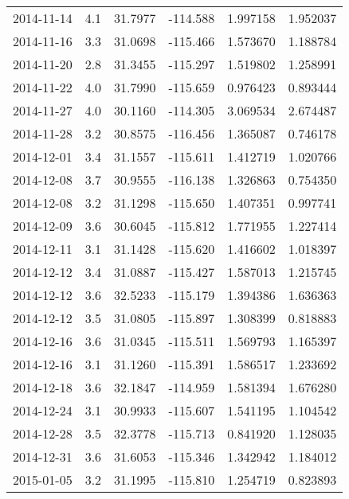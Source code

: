 \begin{tabular}{lrrrrr}
2014-11-14 &       4.1 &  31.7977 &  -114.588 &         1.997158 &         1.952037 \\
2014-11-16 &       3.3 &  31.0698 &  -115.466 &         1.573670 &         1.188784 \\
2014-11-20 &       2.8 &  31.3455 &  -115.297 &         1.519802 &         1.258991 \\
2014-11-22 &       4.0 &  31.7990 &  -115.659 &         0.976423 &         0.893444 \\
2014-11-27 &       4.0 &  30.1160 &  -114.305 &         3.069534 &         2.674487 \\
2014-11-28 &       3.2 &  30.8575 &  -116.456 &         1.365087 &         0.746178 \\
2014-12-01 &       3.4 &  31.1557 &  -115.611 &         1.412719 &         1.020766 \\
2014-12-08 &       3.7 &  30.9555 &  -116.138 &         1.326863 &         0.754350 \\
2014-12-08 &       3.2 &  31.1298 &  -115.650 &         1.407351 &         0.997741 \\
2014-12-09 &       3.6 &  30.6045 &  -115.812 &         1.771955 &         1.227414 \\
2014-12-11 &       3.1 &  31.1428 &  -115.620 &         1.416602 &         1.018397 \\
2014-12-12 &       3.4 &  31.0887 &  -115.427 &         1.587013 &         1.215745 \\
2014-12-12 &       3.6 &  32.5233 &  -115.179 &         1.394386 &         1.636363 \\
2014-12-12 &       3.5 &  31.0805 &  -115.897 &         1.308399 &         0.818883 \\
2014-12-16 &       3.6 &  31.0345 &  -115.511 &         1.569793 &         1.165397 \\
2014-12-16 &       3.1 &  31.1260 &  -115.391 &         1.586517 &         1.233692 \\
2014-12-18 &       3.6 &  32.1847 &  -114.959 &         1.581394 &         1.676280 \\
2014-12-24 &       3.1 &  30.9933 &  -115.607 &         1.541195 &         1.104542 \\
2014-12-28 &       3.5 &  32.3778 &  -115.713 &         0.841920 &         1.128035 \\
2014-12-31 &       3.6 &  31.6053 &  -115.346 &         1.342942 &         1.184012 \\
2015-01-05 &       3.2 &  31.1995 &  -115.810 &         1.254719 &         0.823893 \\

\end{tabular}
